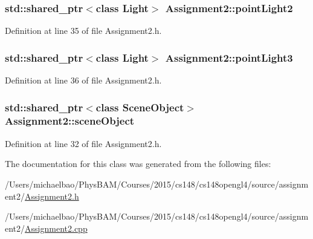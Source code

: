 \subsubsection[{point\+Light2}]{\setlength{\rightskip}{0pt plus 5cm}std\+::shared\+\_\+ptr$<$class {\bf Light}$>$ Assignment2\+::point\+Light2\hspace{0.3cm}{\ttfamily [private]}}\label{class_assignment2_adad4306da57243fada86a48e4edd7063}


Definition at line 35 of file Assignment2.\+h.

\hypertarget{class_assignment2_a23856ba0cbb408090482755bb636a567}{}
\subsubsection[{point\+Light3}]{\setlength{\rightskip}{0pt plus 5cm}std\+::shared\+\_\+ptr$<$class {\bf Light}$>$ Assignment2\+::point\+Light3\hspace{0.3cm}{\ttfamily [private]}}\label{class_assignment2_a23856ba0cbb408090482755bb636a567}


Definition at line 36 of file Assignment2.\+h.

\hypertarget{class_assignment2_a3afcc7cf71f0b1eb855482057beb1146}{}
\subsubsection[{scene\+Object}]{\setlength{\rightskip}{0pt plus 5cm}std\+::shared\+\_\+ptr$<$class {\bf Scene\+Object}$>$ Assignment2\+::scene\+Object\hspace{0.3cm}{\ttfamily [private]}}\label{class_assignment2_a3afcc7cf71f0b1eb855482057beb1146}


Definition at line 32 of file Assignment2.\+h.



The documentation for this class was generated from the following files\+:\begin{DoxyCompactItemize}
\item 
/\+Users/michaelbao/\+Phys\+B\+A\+M/\+Courses/2015/cs148/cs148opengl4/source/assignment2/\hyperlink{_assignment2_8h}{Assignment2.\+h}\item 
/\+Users/michaelbao/\+Phys\+B\+A\+M/\+Courses/2015/cs148/cs148opengl4/source/assignment2/\hyperlink{_assignment2_8cpp}{Assignment2.\+cpp}\end{DoxyCompactItemize}
